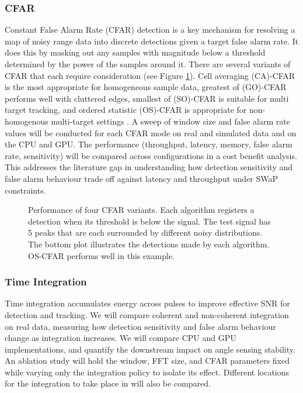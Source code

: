 \subsubsection{CFAR}
Constant False Alarm Rate (CFAR) detection is a key mechanism for resolving a map of noisy range data into discrete detections given a target false alarm rate. It does this by masking out any samples with magnitude below a threshold determined by the power of the samples around it. There are several variants of CFAR that each require consideration (see Figure \ref{fig:cfar}). Cell averaging (CA)-CFAR is the most appropriate for homogeneous sample data, greatest of (GO)-CFAR performs well with cluttered edges, smallest of (SO)-CFAR is suitable for multi target tracking, and ordered statistic (OS)-CFAR is appropriate for non-homogenous multi-target settings \cite{}. A sweep of window size and false alarm rate values will be conducted for each CFAR mode on real and simulated data and on the CPU and GPU. The performance (throughput, latency, memory, false alarm rate, sensitivity) will be compared across configurations in a cost benefit analysis. This addresses the literature gap in understanding how detection sensitivity and false alarm behaviour trade off against latency and throughput under SWaP constraints.

\begin{figure}
    \centering
    
    \caption{ Performance of four CFAR variants. Each algorithm registers a detection when its threshold is below the signal. The test signal has 5 peaks that are each surrounded by different noisy distributions. The bottom plot illustrates the detections made by each algorithm. OS-CFAR performs well in this example.}
    \label{fig:cfar}
\end{figure}


\subsubsection{Time Integration}
Time integration accumulates energy across pulses to improve effective SNR for detection and tracking. We will compare coherent and non-coherent integration on real data, measuring how detection sensitivity and false alarm behaviour change as integration increases. We will compare CPU and GPU implementations, and quantify the downstream impact on angle sensing stability. An ablation study will hold the window, FFT size, and CFAR parameters fixed while varying only the integration policy to isolate its effect. Different locations for the integration to take place in will also be compared.
